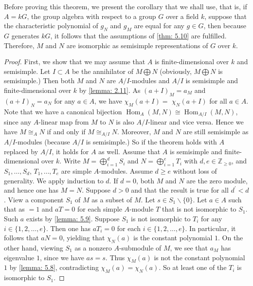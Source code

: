 \documentclass[12pt,a4paper]{report}
\theoremstyle{definition}
\theoremstyle{remark}
\theoremstyle{definition}
\begin{document}
Before proving this theorem, we present the corollary that we shall use, that is, if $A = kG$, the group algebra with respect to a group $G$ over a field $k$, suppose that the characteristic polynomial of $g_N$ and $g_M$ are equal for any $g\in G$, then because $G$ generates $kG$, it follows that the assumptions of \cref{thm: 5.10} are fulfilled. Therefore, $M$ and $N$ are isomorphic as semisimple representations of $G$ over $k$.
\begin{proof}
    First, we show that we may assume that $A$ is finite-dimensional over $k$ and semisimple. Let $I \subset A$ be the annihilator of $M \bigoplus N$ (obviously, $M\bigoplus N$ is semisimple.) Then both $M$ and $N$ are $A / I$-modules and $A / I$ is semisimple and finite-dimensional over $k$ by \cref{lemma: 2.11}. As $(a+I)_{M}=a_{M}$ and $(a+I)_{N}=a_{N}$ for any $a \in A$, we have $\chi_{M}(a+I)=$ $\chi_{N}(a+I)$ for all $a \in A$. Note that we have a canonical bijection $\operatorname{Hom}_{A}(M, N) \cong\operatorname{Hom}_{A / I}(M, N)$, since any $A$-linear map from $M$ to $N$ is also $A / I$-linear and vice versa. Hence we have $M \cong_{A} N$ if and only if $M \cong_{A / I} N$. Moreover, $M$ and $N$ are still semisimple as $A / I$-modules (because $A/I$ is semisimple.) So if the theorem holds with $A$ replaced by $A / I$, it holds for $A$ as well.\smallbreak
    Assume that $A$ is semisimple and finite-dimensional over $k$. Write $M=\bigoplus\limits_{i=1}^{d} S_{i}$ and $N=\bigoplus\limits_{i=1}^{e} T_{i}$ with $d, e \in \mathbb{Z}_{\geq 0}$, and $S_{1}, \ldots, S_{d}$, $T_{1}, \ldots, T_{e}$ are simple $A$-modules. Assume $d \geq e$ without loss of generality. We apply induction to $d$.\smallbreak
If $d=0$, both $M$ and $N$ are the zero module, and hence one has $M=N$.
Suppose $d>0$ and that the result is true for all $d^{\prime}<d$. View a component $S_{1}$ of $M$ as a subset of $M$. Let $s \in S_{1} \backslash\{0\}$. Let $a \in A$ such that as $=1$ and $a T=0$ for each simple $A$-module $T$ that is not isomorphic to $S_{1}$. Such $a$ exists by \cref{lemma: 5.9}.\smallbreak
Suppose $S_{1}$ is not isomorphic to $T_{i}$ for any $i \in\{1,2, \ldots, e\}$. Then one has $a T_{i}=0$ for each $i \in\{1,2, \ldots, e\}$. In particular, it follows that $a N=0$, yielding that $\chi_{N}(a)$ is the constant polynomial $1$.\smallbreak
On the other hand, viewing $S_{1}$ as a nonzero $A$-submodule of $M$, we see that $a_{M}$ has eigenvalue $1$, since we have $a s=s$. Thus $\chi_{M}(a)$ is not the constant polynomial $1$ by \cref{lemma: 5.8}, contradicting $\chi_{M}(a)=\chi_{N}(a)$. So at least one of the $T_{i}$ is isomorphic to $S_{1}$.\smallbreak

\end{proof}
\end{document}
